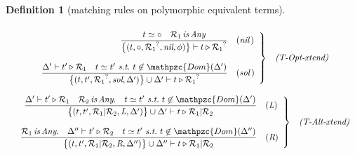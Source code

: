 \documentclass[12pt]{article}
\newtheorem{Definition}{Definition}[section]
\begin{document}
\begin{Definition}[matching rules on polymorphic equivalent terms]
\begin{displaymath}
\begin{array}{c}
    \end{array}
  \end{displaymath}
  
  \begin{displaymath}
    \begin{array}{c}
      
      \begin{array}{rl}
        \left. \begin{array}{rl}
          \dfrac{
            t \simeq \circ
             \quad \mathcal{R}_1 \,\text{\it is}\, \text{\it Any}
          }{
            \bigl\{(t, \circ, {\mathcal{R}_1}^?, \text{\it nil}, \phi)
             \bigr\} \vdash t \triangleright {\mathcal{R}_1}^?           
          }  &  (\text{\it nil}\,)  \\
          \\
          
          \dfrac{
            \Delta' \vdash t' \triangleright \mathcal{R}_1 \quad
             t \simeq t'\ \text{\it s.t.}\
              t \not\in \mathpzc{Dom}(\Delta')
          }{
            \bigl\{(t, t', {\mathcal{R}_1}^?, \text{\it sol},
             \Delta') \bigr\} \cup \Delta' \vdash
              t \triangleright {\mathcal{R}_1}^?
          }  &  (\text{\it sol}\,)
        \end{array} \right\}  &  \text{\it (T-Opt-xtend)}
      \end{array}  \\
      \\
      
      \begin{array}{rl}
        \left. \begin{array}{rl}
          \dfrac{
            \Delta' \vdash t' \triangleright \mathcal{R}_1 \quad
             \mathcal{R}_2 \,\text{\it is}\, \text{\it Any}. \quad
              t \simeq t'\ \text{\it s.t.}\
               t \not\in \mathpzc{Dom}(\Delta')
          }{
            \bigl\{(t, t', \mathcal{R}_1|\mathcal{R}_2,
             \text{\it L}, \Delta') \bigr\} \cup \Delta' \vdash
              t \triangleright \mathcal{R}_1|\mathcal{R}_2
          }  &  (\text{\it L})  \\
          \\
          
          \dfrac{
            \mathcal{R}_1 \,\text{\it is}\, \text{\it Any}. \quad
             \Delta'' \vdash t' \triangleright \mathcal{R}_2 \quad
              t \simeq  t'\ \text{\it s.t.}\
               t \not\in \mathpzc{Dom}(\Delta'')
          }{
            \bigl\{(t, t', \mathcal{R}_1|\mathcal{R}_2,
             \text{\it R}, \Delta'') \bigr\} \cup \Delta'' \vdash
              t \triangleright \mathcal{R}_1|\mathcal{R}_2
          }  &  (\text{\it R})
        \end{array} \right\}  &  \text{\it (T-Alt-xtend)}
      \end{array}
      
    \end{array}
  \end{displaymath}
\end{Definition}
\end{document}
